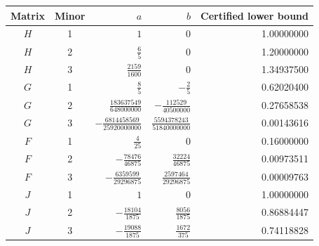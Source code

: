 \begin{tabular}{@{}ccrrr@{}}
\toprule
Matrix & Minor & $a$ & $b$ & Certified lower bound\\
\midrule
$H$ & 1 & $1$ & $0$ & 1.00000000 \\
$H$ & 2 & $\frac{6}{5}$ & $0$ & 1.20000000 \\
$H$ & 3 & $\frac{2159}{1600}$ & $0$ & 1.34937500 \\
$G$ & 1 & $\frac{8}{5}$ & $-\frac{2}{5}$ & 0.62020400 \\
$G$ & 2 & $\frac{183637549}{648000000}$ & $-\frac{112529}{40500000}$ & 0.27658538 \\
$G$ & 3 & $-\frac{6814458569}{25920000000}$ & $\frac{5594378243}{51840000000}$ & 0.00143616 \\
$F$ & 1 & $\frac{4}{25}$ & $0$ & 0.16000000 \\
$F$ & 2 & $-\frac{78476}{46875}$ & $\frac{32224}{46875}$ & 0.00973511 \\
$F$ & 3 & $-\frac{6359599}{29296875}$ & $\frac{2597464}{29296875}$ & 0.00009763 \\
$J$ & 1 & $1$ & $0$ & 1.00000000 \\
$J$ & 2 & $-\frac{18104}{1875}$ & $\frac{8056}{1875}$ & 0.86884447 \\
$J$ & 3 & $-\frac{19088}{1875}$ & $\frac{1672}{375}$ & 0.74118828 \\
\bottomrule
\end{tabular}
